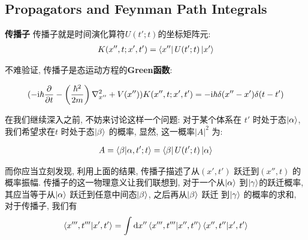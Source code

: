 \subsection{Propagators and Feynman Path Integrals}

\begin{definition}{\bf 传播子}
  传播子就是时间演化算符$U(t'; t)$的坐标矩阵元:
  \begin{equation}
    \begin{aligned}
      K(x'', t; x', t') = \bra{x''} U(t'; t) \ket{x'}
    \end{aligned}
  \end{equation}
\end{definition}

不难验证, 传播子是态运动方程的{\bf Green函数}:

\begin{equation}
  \begin{aligned}
    (- {\rm i} \hbar \pdv{}{t} - \left(\frac{\hbar^{2}}{2m}\right)\nabla_{x''}^{2} + V(x''))K(x'', t; x', t') = - {\rm i} \hbar \delta(x''-x') \delta(t-t')
  \end{aligned}
\end{equation}

在我们继续深入之前, 不妨来讨论这样一个问题: 对于某个体系在 $t'$ 时处于态$\ket{\alpha}$,
我们希望求在$t$ 时处于态$\ket{\beta}$ 的概率, 显然, 这一概率$|A|^{2}$ 为:

\begin{equation}
  \begin{aligned}
    A = \bra{\beta}\ket{\alpha, t';t} = \bra{\beta}U(t'; t) \ket{\alpha}
  \end{aligned}
\end{equation}

而你应当立刻发现, 利用上面的结果, 传播子描述了从$(x', t')$ 跃迁到$(x'', t)$ 的概率振幅.
传播子的这一物理意义让我们联想到, 对于一个从$\ket{\alpha}$ 到$\ket{\gamma}$的跃迁概率,
其应当等于从$\ket{\alpha}$ 跃迁到任意中间态$\ket{\beta}$, 之后再从$\ket{\beta}$ 跃迁
到$\ket{\gamma}$ 的概率的求和, 对于传播子, 我们有
\begin{equation}
  \begin{aligned}
    \bra{x''', t'''}\ket{x', t'} = \int \dd x'' \bra{x''', t'''}\ket{x'', t''}\bra{x'', t''} \ket{x', t'}
  \end{aligned}
\end{equation}

